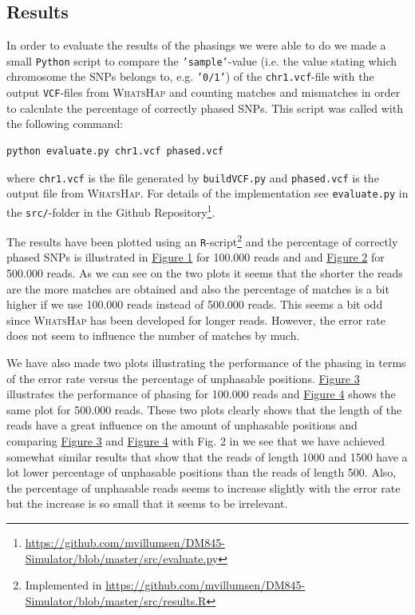 \documentclass[10pt,a4paper]{article}
\begin{document}
\subsection{Results}
In order to evaluate the results of the phasings we were able to do we made a small \texttt{Python} script to compare the \texttt{'sample'}-value (i.e. the value stating which chromosome the SNPs belongs to, e.g. \texttt{'0/1'}) of the \texttt{chr1.vcf}-file with the output \texttt{VCF}-files from \textsc{WhatsHap} and counting matches and mismatches in order to calculate the percentage of correctly phased SNPs. This script was called with the following command:
\begin{lstlisting}
python evaluate.py chr1.vcf phased.vcf
\end{lstlisting}
where \texttt{chr1.vcf} is the file generated by \texttt{buildVCF.py} and \texttt{phased.vcf} is the output file from \textsc{WhatsHap}. For details of the implementation see \texttt{evaluate.py} in the \texttt{src/}-folder in the Github Repository\footnote{\url{https://github.com/mvillumsen/DM845-Simulator/blob/master/src/evaluate.py}}.

The results have been plotted using an \texttt{R}-script\footnote{Implemented in \url{https://github.com/mvillumsen/DM845-Simulator/blob/master/src/results.R}} and the percentage of correctly phased SNPs is illustrated in \hyperref[fig:100k]{Figure 1} for 100.000 reads and and \hyperref[fig:500k]{Figure 2} for 500.000 reads. As we can see on the two plots it seems that the shorter the reads are the more matches are obtained and also the percentage of matches is a bit higher if we use 100.000 reads instead of 500.000 reads. This seems a bit odd since \textsc{WhatsHap} has been developed for longer reads. However, the error rate does not seem to influence the number of matches by much.

We have also made two plots illustrating the performance of the phasing in terms of the error rate versus the percentage of unphasable positions. \hyperref[fig:unphasable100k]{Figure 3} illustrates the performance of phasing for 100.000 reads and  \hyperref[fig:unphasable500k]{Figure 4} shows the same plot for 500.000 reads. These two plots clearly shows that the length of the reads have a great influence on the amount of unphasable positions and comparing \hyperref[fig:unphasable100k]{Figure 3} and \hyperref[fig:unphasable500k]{Figure 4} with Fig. 2 in \cite{whatshap} we see that we have achieved somewhat similar results that show that the reads of length 1000 and 1500 have a lot lower percentage of unphasable positions than the reads of length 500. Also, the percentage of unphasable reads seems to increase slightly with the error rate but the increase is so small that it seems to be irrelevant.
\end{document}
